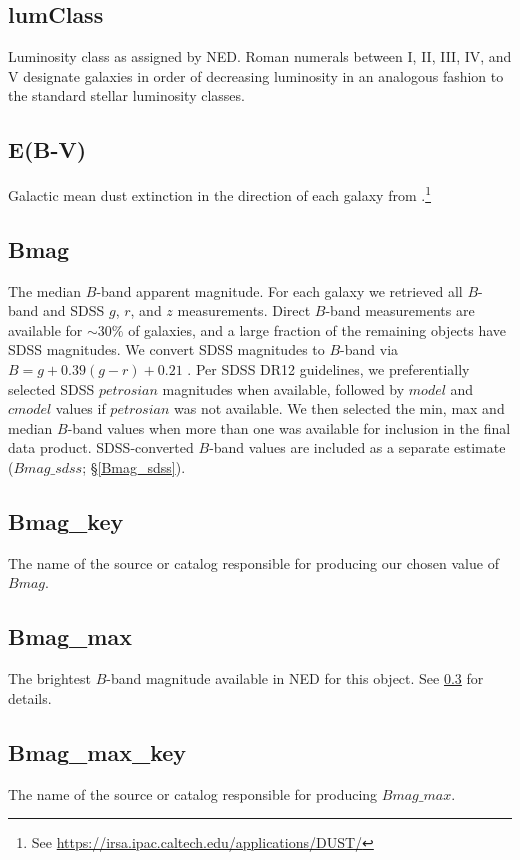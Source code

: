 \subsection{lumClass} \label{lumClass}
Luminosity class as assigned by NED. Roman numerals between I, II, III, IV, and V designate galaxies in order of decreasing luminosity in an analogous fashion to the standard stellar luminosity classes.

\subsection{E(B-V)} \label{E(B-V)}
Galactic mean dust extinction in the direction of each galaxy from \cite{schlafly2011}.\footnote{See \url{https://irsa.ipac.caltech.edu/applications/DUST/}}


\subsection{Bmag} \label{Bmag}
The median $B$-band apparent magnitude. For each galaxy we retrieved all $B$-band and SDSS $g$, $r$, and $z$ measurements. Direct $B$-band measurements are available for $\sim 30\%$ of galaxies, and a large fraction of the remaining objects have SDSS magnitudes. We convert SDSS magnitudes to $B$-band via $B = g + 0.39 (g-r) + 0.21$ \citep{jester2005}. Per SDSS DR12 guidelines, we preferentially selected SDSS $petrosian$ magnitudes when available, followed by $model$ and $cmodel$ values if $petrosian$ was not available. We then selected the min, max and median $B$-band values when more than one was available for inclusion in the final data product. SDSS-converted $B$-band values are included as a separate estimate ($Bmag\_sdss$; \S \ref{Bmag_sdss}). 

\subsection{Bmag\_key} \label{Bmag_key}
The name of the source or catalog responsible for producing our chosen value of $Bmag$.

\subsection{Bmag\_max}
The brightest $B$-band magnitude available in NED for this object. See \ref{Bmag} for details.

\subsection{Bmag\_max\_key}
The name of the source or catalog responsible for producing $Bmag\_max$.

